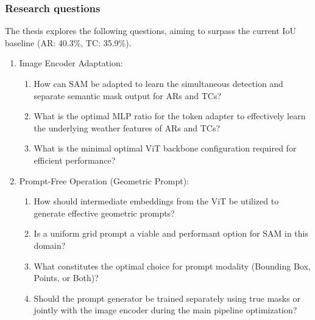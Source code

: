 \subsubsection{Research questions}
The thesis explores the following questions, aiming to surpass the current IoU baseline (AR: 40.3\%, TC: 35.9\%).


\begin{enumerate}

\item \begin{minipage}[t]{\linewidth}
Image Encoder Adaptation:
\begin{enumerate}
\item \begin{minipage}[t]{\linewidth}
How can SAM be adapted to learn the simultaneous detection and separate semantic mask output for ARs and TCs?
\end{minipage}
\item \begin{minipage}[t]{\linewidth}
What is the optimal MLP ratio for the token adapter to effectively learn the underlying weather features of ARs and TCs?
\end{minipage}
\item \begin{minipage}[t]{\linewidth}
What is the minimal optimal ViT backbone configuration required for efficient performance?
\end{minipage}
\end{enumerate}
\end{minipage}

\item \begin{minipage}[t]{\linewidth}
Prompt-Free Operation (Geometric Prompt):
\begin{enumerate}
\item \begin{minipage}[t]{\linewidth}
How should intermediate embeddings from the ViT be utilized to generate effective geometric prompts?
\end{minipage}
\item \begin{minipage}[t]{\linewidth}
Is a uniform grid prompt a viable and performant option for SAM in this domain?
\end{minipage}
\item \begin{minipage}[t]{\linewidth}
What constitutes the optimal choice for prompt modality (Bounding Box, Points, or Both)?
\end{minipage}
\item \begin{minipage}[t]{\linewidth}
Should the prompt generator be trained separately using true masks or jointly with the image encoder during the main pipeline optimization?
\end{minipage}
\end{enumerate}
\end{minipage}


\end{enumerate}
